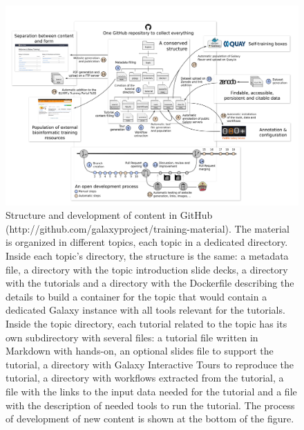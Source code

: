 \begin{figure}
    \centering
    \includegraphics[width=\textwidth]{chapters/images/training-figure-development.png}
    \caption{Structure and development of content in GitHub (http://github.com/galaxyproject/training-material). The material is organized in different topics, each topic in a dedicated directory. Inside each topic’s directory, the structure is the same: a metadata file, a directory with the topic introduction slide decks, a directory with the tutorials and a directory with the Dockerfile describing the details to build a container for the topic that would contain a dedicated Galaxy instance with all tools relevant for the tutorials. Inside the topic directory, each tutorial related to the topic has its own subdirectory with several files: a tutorial file written in Markdown with hands-on, an optional slides file to support the tutorial, a directory with Galaxy Interactive Tours to reproduce the tutorial, a directory with workflows extracted from the tutorial, a file with the links to the input data needed for the tutorial and a file with the description of needed tools to run the tutorial. The process of development of new content is shown at the bottom of the figure.}
    \label{fig:development}
\end{figure}


